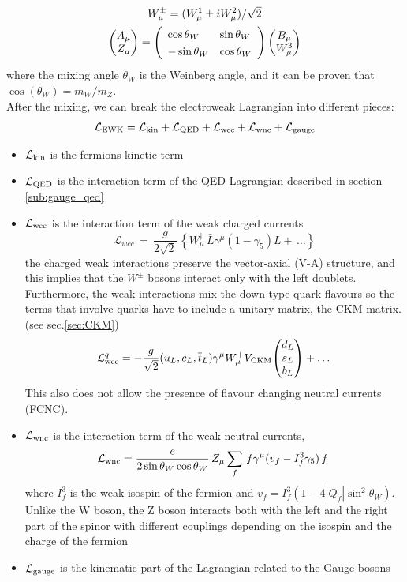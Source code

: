 \begin{gather}
    W_\mu^{\pm}=(W^1_\mu\pm i W^2_\mu)/\sqrt{2}\\
    \db{A_\mu}{Z_\mu}=\left(\begin{array}{l l}{{\cos\theta_{W}}}&{{\sin\theta_{W}}}\\ {{-\sin\theta_{W}}}&{{\cos\theta_{W}}}\end{array}\right)\db{B_\mu}{W^3_\mu}
\end{gather}
where the mixing angle $\theta_W$ is the Weinberg angle, and it can be proven that $\cos(\theta_W)=m_W/m_Z$.\\
After the mixing, we can break the electroweak Lagrangian into different pieces:
\begin{equation}\label{eq:EWK}
    \mathcal{L}_\text{EWK}=\mathcal{L}_\text{kin}+\mathcal{L}_\text{QED}+\mathcal{L}_\text{wcc}+\mathcal{L}_\text{wnc}+\mathcal{L}_\text{gauge}
\end{equation}

\begin{itemize}
    \item  $\mathcal{L}_\text{kin}$ is the fermions kinetic term
    \item $\mathcal{L}_\text{QED}$ is the interaction term of the QED Lagrangian described in section \ref{sub:gauge_qed}
    \item $\mathcal{L}_\text{wcc}$ is the interaction term of the weak charged currents
    \begin{equation}
        {\mathcal{L}}_{wcc}\,=\,\frac{g}{2{\sqrt{2}}}\,\left\{W_{\mu}^{\dagger}\,\bar{L}\gamma^{\mu}(1-\gamma_{5})L+\,\dots \right\}
    \end{equation}
    the charged weak interactions preserve the vector-axial (V-A) structure, and this implies that the $W^\pm$ bosons interact only with the left doublets.\\
    Furthermore, the weak interactions mix the down-type quark flavours so the terms that involve quarks have to include a unitary matrix, the CKM matrix. (see sec.\ref{sec:CKM})
    \begin{equation}
        \Lg{wcc}^q=-\frac{g}{\sqrt{2}}(\overline{{{u}}}_{L},\overline{{{c}}}_{L},\overline{{{t}}}_{L})\gamma^{\mu}W_{\mu}^{+}V_{\mathrm{CKM}}\tb{d_{L}}{s_{L}}{b_L}+\dots
    \end{equation}
    This also does not allow the presence of flavour changing neutral currents (FCNC).
    \item $\mathcal{L}_\text{wnc}$ is the interaction term of the weak neutral currents,
    \begin{equation}
        \mathcal{L}_\text{wnc}=\frac{e}{2\sin\theta_{W}\cos\theta_{W}}\,Z_{\mu}\sum_{f}\,\bar{f}\gamma^{\mu}(v_{f}-I^3_{f}\gamma_{5})\,f\;
    \end{equation}
    where $I^3_f$ is the weak isospin of the fermion and $v_f=I^{3}_{f}\left(1-4|Q_{f}|\sin^{2}\theta_{W}\right)$.
    Unlike the W boson, the Z boson interacts both with the left and the right part of the spinor with different couplings depending on the isospin and the charge of the fermion 
    \item $\mathcal{L}_\text{gauge}$ is the kinematic part of the Lagrangian related to the Gauge bosons
\end{itemize}


